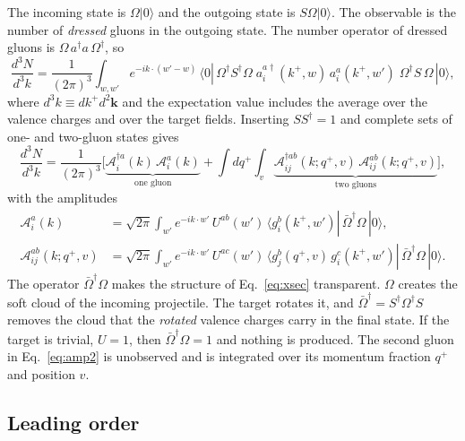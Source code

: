 The incoming state is $\Omega|0\rangle$ and the outgoing state is $S\Omega|0\rangle$. The observable is the number of \emph{dressed} gluons in the outgoing state. The number operator of dressed gluons is $\Omega\,a^\dagger a\,\Omega^\dagger$, so
\begin{equation}
\frac{d^3N}{d^3k}=\frac{1}{(2\pi)^3}\int_{w,w'}e^{-ik\cdot(w'-w)}\,\langle0|\,\Omega^\dagger S^\dagger\Omega\;a^{a\dagger}_i(k^+,w)\,a^a_i(k^+,w')\;\Omega^\dagger S\,\Omega\,|0\rangle,
\label{eq:xsec}
\end{equation}
where $d^3k\equiv dk^+d^2\mathbf k$ and the expectation value includes the average over the valence charges and over the target fields. Inserting $SS^\dagger=1$ and complete sets of one- and two-gluon states gives
\begin{equation}
\frac{d^3N}{d^3k}=\frac{1}{(2\pi)^3}\bigg[\underbrace{\mathcal A^{\dagger a}_i(k)\,\mathcal A^a_i(k)}_{\text{one gluon}}+\int dq^+\int_v\underbrace{\mathcal A^{\dagger ab}_{ij}(k;q^+,v)\,\mathcal A^{ab}_{ij}(k;q^+,v)}_{\text{two gluons}}\bigg],
\label{eq:groups}
\end{equation}
with the amplitudes
\begin{align}
\mathcal A^a_i(k)&=\sqrt{2\pi}\int_{w'}e^{-ik\cdot w'}\,U^{ab}(w')\,\langle g^b_i(k^+,w')|\,\bar\Omega^\dagger\Omega\,|0\rangle,\label{eq:amp1}\\
\mathcal A^{ab}_{ij}(k;q^+,v)&=\sqrt{2\pi}\int_{w'}e^{-ik\cdot w'}\,U^{ac}(w')\,\langle g^b_j(q^+,v)\,g^c_i(k^+,w')|\,\bar\Omega^\dagger\Omega\,|0\rangle.\label{eq:amp2}
\end{align}
The operator $\bar\Omega^\dagger\Omega$ makes the structure of Eq.~\eqref{eq:xsec} transparent. $\Omega$ creates the soft cloud of the incoming projectile. The target rotates it, and $\bar\Omega^\dagger=S^\dagger\Omega^\dagger S$ removes the cloud that the \emph{rotated} valence charges carry in the final state. If the target is trivial, $U=1$, then $\bar\Omega^\dagger\Omega=1$ and nothing is produced. The second gluon in Eq.~\eqref{eq:amp2} is unobserved and is integrated over its momentum fraction $q^+$ and position $v$.

\subsection{Leading order}\label{sec:LO}

